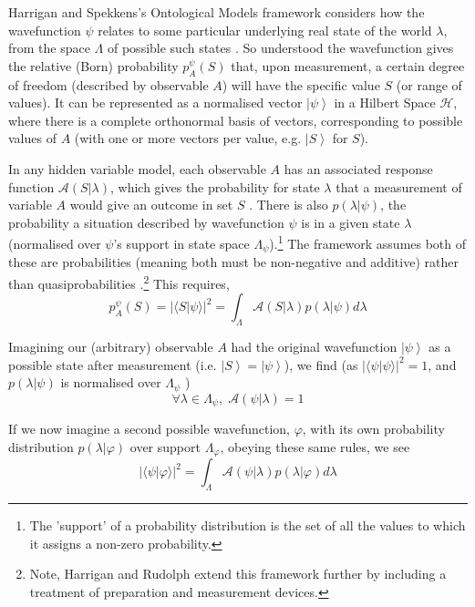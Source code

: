 \documentclass[superscriptaddress, floatfix,nofootinbib,12pt]{revtex4-2}
\newcommand{\ket}[1]{\left| #1 \right\rangle}
\newcommand{\braket}[2]{\langle #1|#2 \rangle}
\begin{document}
Harrigan and Spekkens's Ontological Models framework considers how the wavefunction $\psi$ relates to some particular underlying real state of the world $\lambda$, from the space $\Lambda$ of possible such states \cite{Spekkens2005Contextuality,Rudolph2006Ontological,Harrigan2007Ontological,Spekkens2007EpistTot, Harrigan2010Nonlocality}. So understood the wavefunction gives the relative (Born) probability $p^\psi_A(S)$ that, upon measurement, a certain degree of freedom (described by observable $A$) will have the specific value $S$ (or range of values). It can be represented as a normalised vector $\ket{\psi}$ in a Hilbert Space $\mathcal{H}$, where there is a complete orthonormal basis of vectors, corresponding to possible values of $A$ (with one or more vectors per value, e.g. $\ket{S}$ for $S$).

In any hidden variable model, each observable $A$ has an associated response function $\mathcal{A}(S\vert\lambda)$, which gives the probability for state $\lambda$ that a measurement of variable $A$ would give an outcome in set $S$ \cite{Schlosshauer2012Implications}. There is also $p(\lambda\vert\psi)$, the probability a situation described by wavefunction $\psi$ is in a given state $\lambda$ (normalised over $\psi$'s support in state space $\Lambda_\psi$).\footnote{The 'support' of a probability distribution is the set of all the values to which it assigns a non-zero probability.} The framework assumes both of these are probabilities (meaning both must be non-negative and additive) rather than quasiprobabilities \cite{Harrigan2007ProbDistn}.\footnote{Note, Harrigan and Rudolph extend this framework further by including a treatment of preparation and measurement devices.}
This requires,
\begin{equation}
    p^\psi_A(S)
    =\vert\braket{S}{\psi}\vert^2
    = \int_{\Lambda}\mathcal{A}(S\vert\lambda) p(\lambda\vert\psi) d\lambda
\end{equation}

Imagining our (arbitrary) observable $A$ had the original wavefunction $\ket{\psi}$ as a possible state after measurement (i.e. $\ket{S}=\ket{\psi}$), we find (as $\vert\braket{\psi}{\psi}\vert^2=1$, and $p(\lambda\vert\psi)$ is normalised over $\Lambda_\psi$ \cite{Maroney2012Statistical})
\begin{equation}
    \forall\lambda\in\Lambda_\psi,\;\mathcal{A}(\psi\vert\lambda) = 1 
\end{equation}

If we now imagine a second possible wavefunction, $\varphi$, with its own probability distribution $p(\lambda\vert\varphi)$ over support $\Lambda_\varphi$, obeying these same rules, we see
\begin{equation}
    \vert\braket{\psi}{\varphi}\vert^2
    = \int_{\Lambda}\mathcal{A}(\psi\vert\lambda) p(\lambda\vert\varphi) d\lambda
\end{equation}
\end{document}
